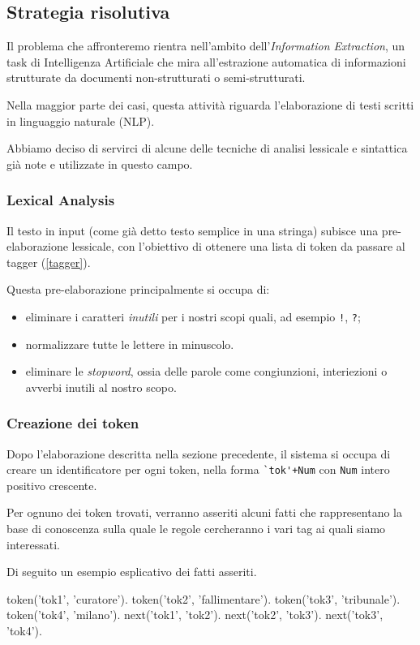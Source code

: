 \subsection{Strategia risolutiva}
Il problema che affronteremo rientra nell'ambito dell'\emph{Information Extraction}, un task di Intelligenza Artificiale che mira all'estrazione automatica di informazioni strutturate da documenti non-strutturati o semi-strutturati.

Nella maggior parte dei casi, questa attività riguarda l'elaborazione di testi scritti in linguaggio naturale (NLP).

Abbiamo deciso di servirci di alcune delle tecniche di analisi lessicale e sintattica già note e utilizzate in questo campo.

\subsubsection{Lexical Analysis}
Il testo in input (come già detto testo semplice in una stringa) subisce una pre-elaborazione lessicale, con l'obiettivo di ottenere una lista di token da passare al tagger (\ref{tagger}).

Questa pre-elaborazione principalmente si occupa di:
\begin{itemize}
\item eliminare i caratteri \emph{inutili} per i nostri scopi quali, ad esempio \verb+!+, \verb+?+;
\item normalizzare tutte le lettere in minuscolo.
\item eliminare le \emph{stopword}, ossia delle parole come congiunzioni, interiezioni o avverbi inutili al nostro scopo.
\end{itemize}


\subsubsection{Creazione dei token}
Dopo l'elaborazione descritta nella sezione precedente, il sistema si occupa di creare un identificatore per ogni token, nella forma \verb:`tok'+Num: con \verb+Num+ intero positivo crescente.

Per ognuno dei token trovati, verranno asseriti alcuni fatti che rappresentano la base di conoscenza sulla quale le regole cercheranno i vari tag ai quali siamo interessati.

Di seguito un esempio esplicativo dei fatti asseriti.

\begin{prologcode}
token('tok1', 'curatore').
token('tok2', 'fallimentare').
token('tok3', 'tribunale').
token('tok4', 'milano').
next('tok1', 'tok2').
next('tok2', 'tok3').
next('tok3', 'tok4').
\end{prologcode}


